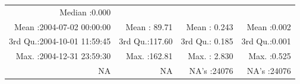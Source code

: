 \documentclass[
  10pt,
  a4paper,oneside]{article}
\begin{document}
\begin{longtable}[]{@{}rrrr@{}}
\begin{minipage}[t]{0.19\columnwidth}
Median :0.000\strut
\end{minipage}\tabularnewline
\begin{minipage}[t]{0.33\columnwidth}\raggedleft
Mean :2004-07-02 00:00:00\strut
\end{minipage} & \begin{minipage}[t]{0.19\columnwidth}\raggedleft
Mean : 89.71\strut
\end{minipage} & \begin{minipage}[t]{0.19\columnwidth}\raggedleft
Mean : 0.243\strut
\end{minipage} & \begin{minipage}[t]{0.19\columnwidth}\raggedleft
Mean :0.002\strut
\end{minipage}\tabularnewline
\begin{minipage}[t]{0.33\columnwidth}\raggedleft
3rd Qu.:2004-10-01 11:59:45\strut
\end{minipage} & \begin{minipage}[t]{0.19\columnwidth}\raggedleft
3rd Qu.:117.60\strut
\end{minipage} & \begin{minipage}[t]{0.19\columnwidth}\raggedleft
3rd Qu.: 0.185\strut
\end{minipage} & \begin{minipage}[t]{0.19\columnwidth}\raggedleft
3rd Qu.:0.001\strut
\end{minipage}\tabularnewline
\begin{minipage}[t]{0.33\columnwidth}\raggedleft
Max. :2004-12-31 23:59:30\strut
\end{minipage} & \begin{minipage}[t]{0.19\columnwidth}\raggedleft
Max. :162.81\strut
\end{minipage} & \begin{minipage}[t]{0.19\columnwidth}\raggedleft
Max. : 2.830\strut
\end{minipage} & \begin{minipage}[t]{0.19\columnwidth}\raggedleft
Max. :0.525\strut
\end{minipage}\tabularnewline
\begin{minipage}[t]{0.33\columnwidth}\raggedleft
NA\strut
\end{minipage} & \begin{minipage}[t]{0.19\columnwidth}\raggedleft
NA\strut
\end{minipage} & \begin{minipage}[t]{0.19\columnwidth}\raggedleft
NA's :24076\strut
\end{minipage} & \begin{minipage}[t]{0.19\columnwidth}\raggedleft
NA's :24076\strut
\end{minipage}\tabularnewline
\bottomrule
\end{longtable}
\end{document}
